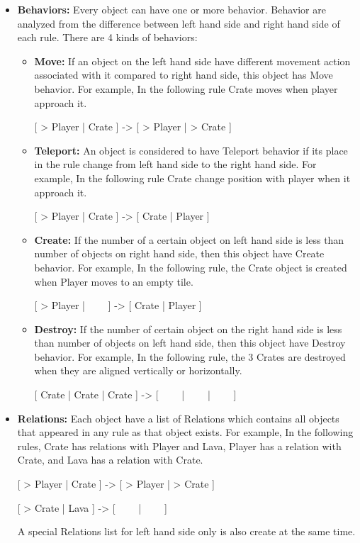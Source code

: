 \begin{itemize}
\begin{center}
		[ > Crate | Crate ] -> [ > Crate | > Crate ]
	\end{center}
	The Crate object appeared in both rules. The first rule the Crate object appeared once, while the second rule it appeared twice. That means the minimum number of Crates is 2.
	\item \textbf{Behaviors:} Every object can have one or more behavior. Behavior are analyzed from the difference between left hand side and right hand side of each rule. There are 4 kinds of behaviors:
		\begin{itemize} \itemsep0pt \parskip0pt 
			\item \textbf{Move:} If an object on the left hand side have different movement action associated with it compared to right hand side, this object has Move behavior. For example, In the following rule Crate moves when player approach it.
			\begin{center}
				[ > Player | Crate ] -> [ > Player | > Crate ]
			\end{center}
			\item \textbf{Teleport:} An object is considered to have Teleport behavior if its place in the rule change from left hand side to the right hand side. For example, In the following rule Crate change position with player when it approach it.
			\begin{center}
				[ > Player | Crate ] -> [ Crate | Player ]
			\end{center}
			\item \textbf{Create:} If the number of a certain object on left hand side is less than number of objects on right hand side, then this object have Create behavior. For example, In the following rule, the Crate object is created when Player moves to an empty tile.
			\begin{center}
				[ > Player | \ \ \ \ ] -> [ Crate | Player ]
			\end{center}
			\item \textbf{Destroy:} If the number of certain object on the right hand side is less than number of objects on left hand side, then this object have Destroy behavior. For example, In the following rule, the 3 Crates are destroyed when they are aligned vertically or horizontally.
			\begin{center}
				[ Crate | Crate | Crate ] -> [ \ \ \ \ | \ \ \ \ | \ \ \ \ ]
			\end{center}
		\end{itemize}
	\item \textbf{Relations:} Each object have a list of Relations which contains all objects that appeared in any rule as that object exists. For example, In the following rules, Crate has relations with Player and Lava, Player has a relation with Crate, and Lava has a relation with Crate.
	\begin{center}
		[ > Player | Crate ] -> [ > Player | > Crate ]
	\end{center}
	\begin{center}
		[ > Crate | Lava ] -> [ \ \ \ \ | \ \ \ \ ]
	\end{center}
	A special Relations list for left hand side only is also create at the same time.	
\end{itemize}

